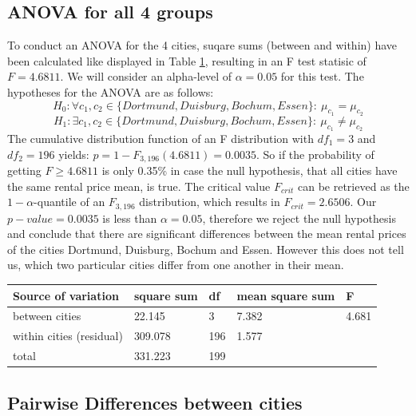 \documentclass[12 pt]{scrartcl}
\begin{document}
\subsection{ANOVA for all 4 groups}


To conduct an ANOVA for the 4 cities, suqare sums (between and within) have been calculated like displayed in Table \ref{tab:anova1}, resulting in an F test statisic of $F = 4.6811 $. We will consider an alpha-level of $\alpha = 0.05 $ for this test.
The hypotheses for the ANOVA are as follows:
\[ H_0: \forall c_1,c_2 \in \{Dortmund,Duisburg,Bochum,Essen\}: \ \mu_{c_1} = \mu_{c_2}   \]
\[ H_1: \exists c_1,c_2 \in \{Dortmund,Duisburg,Bochum,Essen\}: \ \mu_{c_1} \neq \mu_{c_2}   \]
The cumulative distribution function of an F distribution with $df_1 = 3$ and $df_2 = 196$ yields: $ p = 1 - F_{3,196}(4.6811) = 0.0035$.
So if the probability of getting $ F \ge  4.6811$ is only 0.35\% in case the null hypothesis, that all cities have the same rental price mean, is true.
The critical value $F_{crit}$ can be retrieved as the $1-\alpha$-quantile of an $F_{3,196}$ distribution, which results in $F_{crit} = 2.6506$.
Our $p-value = 0.0035$ is less than $\alpha = 0.05$, therefore we reject the null hypothesis and conclude that there are significant differences between the mean rental prices of the cities Dortmund, Duisburg, Bochum and Essen. However this does not tell us, which two particular cities differ from one another in their mean.

\begin{table}[ht]
  \centering
  \label{tab:anova1}
  \begin{tabular}{l|llll}
    Source of variation      & square sum & df  & mean square sum & F     \\
    \hline
    between cities           & 22.145     & 3   & 7.382           & 4.681 \\
    within cities (residual) & 309.078    & 196 & 1.577           &       \\
    total                    & 331.223    & 199 &                 &       \\
  \end{tabular}
\end{table}

\subsection{Pairwise Differences between cities}
\end{document}
